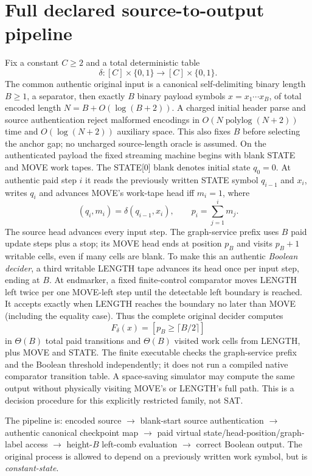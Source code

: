 \documentclass[11pt]{article}
\begin{document}
\section{Full declared source-to-output pipeline}
Fix a constant $C\ge2$ and a total deterministic table
\[
\delta:[C]\times\{0,1\}\longrightarrow[C]\times\{0,1\}.
\]
The common authentic original input is a canonical self-delimiting
binary length $B\ge1$, a separator, then exactly $B$ binary
payload symbols $x=x_1\cdots x_B$, of total encoded length
$N=B+O(\log(B+2))$. A charged initial header parse and
source authentication reject malformed encodings in
$O(N\operatorname{polylog}(N+2))$ time and $O(\log(N+2))$
auxiliary space. This also fixes $B$ before selecting the
anchor gap; no uncharged source-length oracle is assumed.
On the authenticated payload the fixed streaming machine
begins with blank STATE and MOVE work tapes. 
The STATE[0] blank denotes initial state $q_0=0$. At authentic 
paid step $i$ it reads the previously written STATE symbol 
$q_{i-1}$ and $x_i$, writes $q_i$ and advances MOVE's work-tape 
head iff $m_i=1$, where
\[
(q_i,m_i)=\delta(q_{i-1},x_i),\qquad
p_i=\sum_{j=1}^{i}m_j.
\]
The source head advances every input step. The graph-service
prefix uses $B$ paid update steps plus a stop; its MOVE head
ends at position $p_B$ and visits $p_B+1$ writable cells,
even if many cells are blank. To make this an authentic
\emph{Boolean decider}, a third writable LENGTH tape advances 
its head once per input step, ending at $B$. At endmarker,
a fixed finite-control comparator moves LENGTH left twice
per one MOVE-left step until the detectable left boundary
is reached. It accepts exactly when LENGTH reaches the
boundary no later than MOVE (including the equality case).
Thus the complete original decider computes
\[
F_\delta(x)=[p_B\ge\lceil B/2\rceil]
\]
in $\Theta(B)$ total paid transitions and $\Theta(B)$
visited work cells from LENGTH, plus MOVE and STATE.
The finite executable checks the graph-service prefix
and the Boolean threshold independently; it does not
run a compiled native comparator transition table.
A space-saving simulator may compute the same output
without physically visiting MOVE's or LENGTH's full path.
This is a decision procedure for this explicitly
restricted family, not SAT.

The pipeline is: encoded source $\to$ blank-start source 
authentication $\to$ authentic canonical checkpoint map 
$\to$ paid virtual state/head-position/graph-label access 
$\to$ height-$B$ left-comb evaluation $\to$ correct Boolean 
output. The original process is allowed to depend on a 
previously written work symbol, but is \emph{constant-state}.
\end{document}
